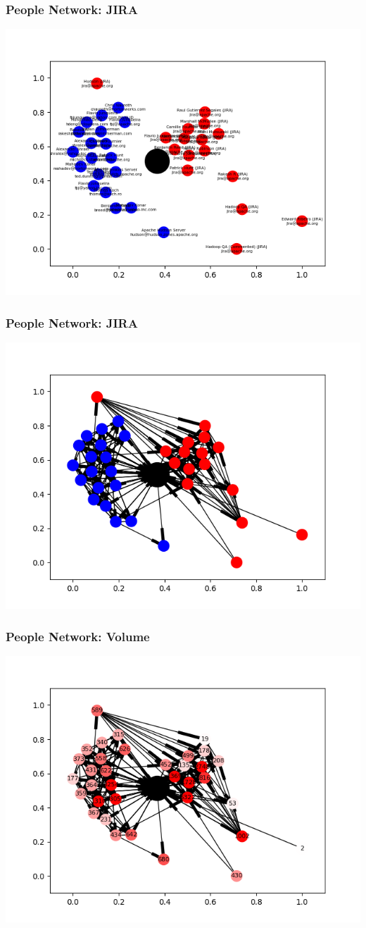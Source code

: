 \documentclass{beamer}
\begin{document}
\begin{frame}\frametitle{People Network: JIRA}
\centering
\includegraphics[width=\textwidth]{graph4.png}
\end{frame}
\begin{frame}\frametitle{People Network: JIRA}
\centering
\includegraphics[width=\textwidth]{graph5.png}
\end{frame}
\begin{frame}\frametitle{People Network: Volume}
\centering
\includegraphics[width=\textwidth]{graph6.png}
\end{frame}
\end{document}
